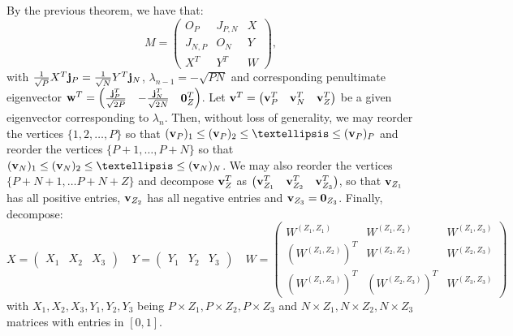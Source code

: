 \documentclass[12pt]{article}
\begin{document}
By the previous theorem, we have that:
    \begin{equation*}
        M = \begin{pmatrix} O_{P} & J_{P,N} & X \\ J_{N,P} & O_{N} & Y \\ X^T & Y^T & W
        \end{pmatrix},
    \end{equation*}
    with $\frac{1}{\sqrt{P}}X^T\bold{j}_P = \frac{1}{\sqrt{N}}Y^T\bold{j}_N$, $\lambda_{n-1} = -\sqrt{PN}$ and corresponding penultimate eigenvector $\bold{w}^T = \begin{pmatrix} \frac{\bold{j}_P^T}{\sqrt{2P}} & -\frac{\bold{j}_N^T}{\sqrt{2N}} & \bold{0}^T_{Z} \end{pmatrix}$. Let $\bold{v}^T = \begin{pmatrix}\bold{v}^T_P & \bold{v}^T_N & \bold{v}^T_Z\end{pmatrix}$ be a given eigenvector corresponding to $\lambda_n$. Then, without loss of generality, we may reorder the vertices $\{1,2,\dots, P\}$ so that $(\bold{v}_P)_1 \le (\bold{v}_P)_2 \le \dots \le (\bold{v}_P)_P$ and reorder the vertices $\{P+1,\dots, P+N\}$ so that $(\bold{v}_N)_1 \le (\bold{v}_N)_2 \le \dots \le (\bold{v}_N)_N$. We may also reorder the vertices $\{P+N+1,\dots P+N+Z\}$ and decompose $\bold{v}_Z^T$ as $\begin{pmatrix} \bold{v}^T_{Z_1} & \bold{v}^T_{Z_2} & \bold{v}^T_{Z_3} \end{pmatrix}$, so that $\bold{v}_{Z_1}$ has all positive entries, $\bold{v}_{Z_2}$ has all negative entries and $\bold{v}_{Z_3} = \bold{0}_{Z_3}$. Finally, decompose:
\begin{equation*}
    X = \begin{pmatrix}
        X_1 & X_2 & X_3
    \end{pmatrix} \quad Y = \begin{pmatrix}
        Y_1 & Y_2 & Y_3
    \end{pmatrix} \quad W = \begin{pmatrix}
        W^{(Z_1,Z_1)} & W^{(Z_1,Z_2)} & W^{(Z_1,Z_3)} \\ \left(W^{(Z_1,Z_2)}\right)^T & W^{(Z_2,Z_2)} & W^{(Z_2,Z_3)} \\\left(W^{(Z_1,Z_3)}\right)^T & \left(W^{(Z_2,Z_3)}\right)^T & W^{(Z_3,Z_3)}
    \end{pmatrix}
\end{equation*}
with $X_1,X_2,X_3,Y_1,Y_2,Y_3$ being $P\times Z_1, P\times Z_2, P\times Z_3$ and $N\times Z_1, N\times Z_2,N\times Z_3$ matrices with entries in $[0,1]$. 
\end{document}

